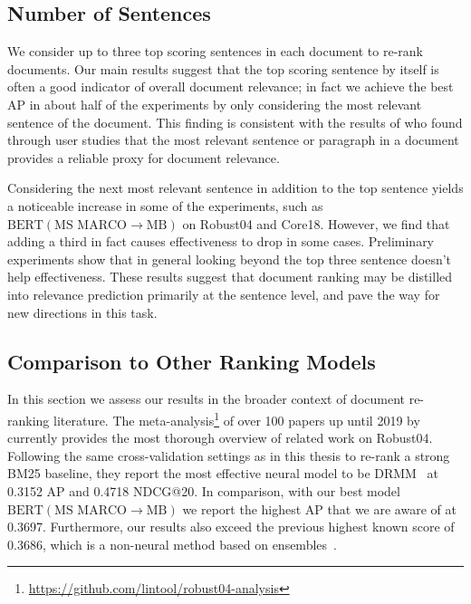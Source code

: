 \subsection{Number of Sentences}

We consider up to three top scoring sentences in each document to re-rank documents.
Our main results suggest that the top scoring sentence by itself is often a good indicator of overall document relevance; in fact we achieve the best AP in about half of the experiments by only considering the most relevant sentence of the document.
This finding is consistent with the results of \cite{zhang2018effective} who found through user studies that the most relevant sentence or paragraph in a document provides a reliable proxy for document relevance.

Considering the next most relevant sentence in addition to the top sentence yields a noticeable increase in some of the experiments, such as $ \textrm{BERT}(\textrm{MS MARCO}\rightarrow\textrm{MB}) $ on Robust04 and Core18.
However, we find that adding a third in fact causes effectiveness to drop in some cases.
Preliminary experiments show that in general looking beyond the top three sentence doesn't help effectiveness.
These results suggest that document ranking may be distilled into relevance prediction primarily at the sentence level, and pave the way for new directions in this task.


\subsection{Comparison to Other Ranking Models}

In this section we assess our results in the broader context of document re-ranking literature.
The meta-analysis\footnote{\url{https://github.com/lintool/robust04-analysis}} of over 100 papers up until 2019 by \cite{Yang_etal_SIGIR2019} currently provides the most thorough overview of related work on Robust04.
Following the same cross-validation settings as in this thesis to re-rank a strong BM25 baseline, they report the most effective neural model to be DRMM~\cite{guo2016deep} at 0.3152 AP and 0.4718 NDCG@20.
In comparison, with our best model $ \textrm{BERT}(\textrm{MS MARCO}\rightarrow\textrm{MB}) $ we report the highest AP that we are aware of at 0.3697.
Furthermore, our results also exceed the previous highest known score of 0.3686, which is a non-neural method based on ensembles~\cite{Cormack:2009:RRF:1571941.1572114}.

